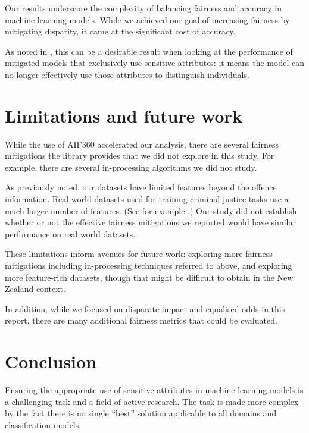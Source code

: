 \documentclass[runningheads]{llncs}
\begin{document}
Our results underscore the complexity of balancing fairness and
accuracy in machine learning models. While we achieved our goal of
increasing fairness by mitigating disparity, it came at the
significant cost of accuracy.

As noted in \cite{feldman2015certifying}, this can be a desirable
result when looking at the performance of mitigated models that
exclusively use sensitive attributes: it means the model can no longer
effectively use those attributes to distinguish individuals.

\section{Limitations and future work}
\label{sec:limit-future-work}

While the use of AIF360 \cite{bellamy2018ai} accelerated our analysis,
there are several fairness mitigations the library provides that we
did not explore in this study. For example, there are several
in-processing algorithms we did not study.

As previously noted, our datasets have limited features beyond the
offence information. Real world datasets used for training criminal
justice tasks use a much larger number of features. (See for example
\cite{fabris2022algorithmic}.) Our study did not establish whether or
not the effective fairness mitigations we reported would have similar
performance on real world datasets.

These limitations inform avenues for future work: exploring more
fairness mitigations including in-processing techniques referred to
above, and exploring more feature-rich datasets, though that might be
difficult to obtain in the New Zealand context.

In addition, while we focused on disparate impact and equalised odds
in this report, there are many additional fairness metrics that could
be evaluated.


\section{Conclusion}
\label{sec:conclusion}

Ensuring the appropriate use of sensitive attributes in machine
learning models is a challenging task and a field of active research.
The task is made more complex by the fact there is no single ``best''
solution applicable to all domains and classification models.
\end{document}
